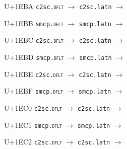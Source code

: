 \documentclass{article}
\begin{document}
\begin{substitutions}
\goodbreak

U+1EBA  \linebreak
    \texttt{c2sc.\textsc{dflt}} $\to$  \linebreak
    \texttt{c2sc.latn} $\to$  

\goodbreak

U+1EBB  \linebreak
    \texttt{smcp.\textsc{dflt}} $\to$  \linebreak
    \texttt{smcp.latn} $\to$  

\goodbreak

U+1EBC  \linebreak
    \texttt{c2sc.\textsc{dflt}} $\to$  \linebreak
    \texttt{c2sc.latn} $\to$  

\goodbreak

U+1EBD  \linebreak
    \texttt{smcp.\textsc{dflt}} $\to$  \linebreak
    \texttt{smcp.latn} $\to$  

\goodbreak

U+1EBE  \linebreak
    \texttt{c2sc.\textsc{dflt}} $\to$  \linebreak
    \texttt{c2sc.latn} $\to$  

\goodbreak

U+1EBF  \linebreak
    \texttt{smcp.\textsc{dflt}} $\to$  \linebreak
    \texttt{smcp.latn} $\to$  

\goodbreak

U+1EC0  \linebreak
    \texttt{c2sc.\textsc{dflt}} $\to$  \linebreak
    \texttt{c2sc.latn} $\to$  

\goodbreak

U+1EC1  \linebreak
    \texttt{smcp.\textsc{dflt}} $\to$  \linebreak
    \texttt{smcp.latn} $\to$  

\goodbreak

U+1EC2  \linebreak
    \texttt{c2sc.\textsc{dflt}} $\to$  \linebreak
    \texttt{c2sc.latn} $\to$  


\end{substitutions}
\end{document}
